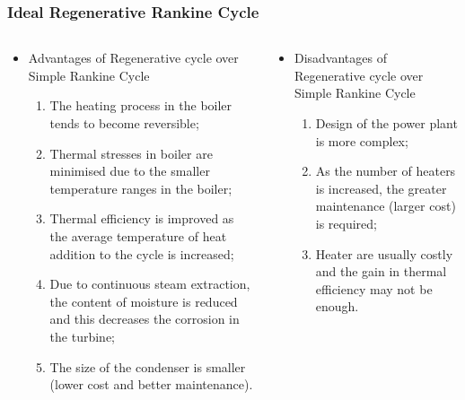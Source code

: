 \documentclass[10pt,compress,handout,ignorenonframetext]{beamer}
\begin{document}
\begin{frame}
 \frametitle{Ideal Regenerative Rankine Cycle}
  \begin{columns}
   \begin{column}[c]{0.5\linewidth}
    \begin{itemize}
     \item <1-> Advantages of Regenerative cycle over Simple Rankine Cycle
     \begin{enumerate} %
      \item <2-> The heating process in the boiler tends to become reversible;
      \item <3-> Thermal stresses in boiler are minimised due to the smaller temperature ranges in the boiler;
      \item <4-> Thermal efficiency is improved as the average temperature of heat addition to the cycle is increased;
      \item <5-> Due to continuous steam extraction, the content of moisture is reduced and this decreases the corrosion in the turbine;
      \item<6-> The size of the condenser is smaller (lower cost and better maintenance).
     \end{enumerate}
    \end{itemize} 
   \end{column}

   \begin{column}[c]{0.5\linewidth}  
    \begin{itemize}
     \item <7-> Disadvantages of Regenerative cycle over Simple Rankine Cycle
     \begin{enumerate} %
      \item <8-> Design of the power plant is more complex;
      \item <9-> As the number of heaters is increased, the greater maintenance (larger cost) is required;
      \item <10-> Heater are usually costly and the gain in thermal efficiency may not be enough. 
     \end{enumerate}
    \end{itemize} 
   \end{column}
  \end{columns}
  
\end{frame}
\end{document}
